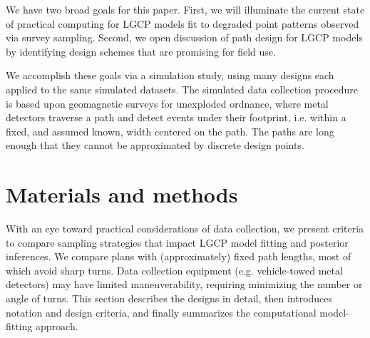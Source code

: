\documentclass[review]{elsarticle}
\begin{document}
We have two broad goals for this paper. First, we will illuminate the current
state of practical computing for LGCP models fit to degraded point patterns
observed via survey sampling. Second, we open discussion of path design for
LGCP models by identifying design schemes that are promising for field use.

We accomplish these goals via a simulation study, using many designs each
applied to the same simulated datasets. The simulated data collection procedure
is based upon geomagnetic surveys for unexploded ordnance, where metal
detectors traverse a path and detect events under their footprint, i.e. within
a fixed, and assumed known, width centered on the path. The paths are long
enough that they cannot be approximated by discrete design points.


\section{Materials and methods}


With an eye toward practical considerations of data collection, we present
criteria to compare sampling strategies that impact LGCP model fitting and
posterior inferences. We compare plans with (approximately) fixed path lengths,
most of which avoid sharp turns. Data collection equipment (e.g. vehicle-towed
metal detectors) may have limited maneuverability, requiring minimizing the
number or angle of turns. This section describes the designs in detail, then
introduces notation and design criteria, and finally summarizes the
computational model-fitting approach.
\end{document}
